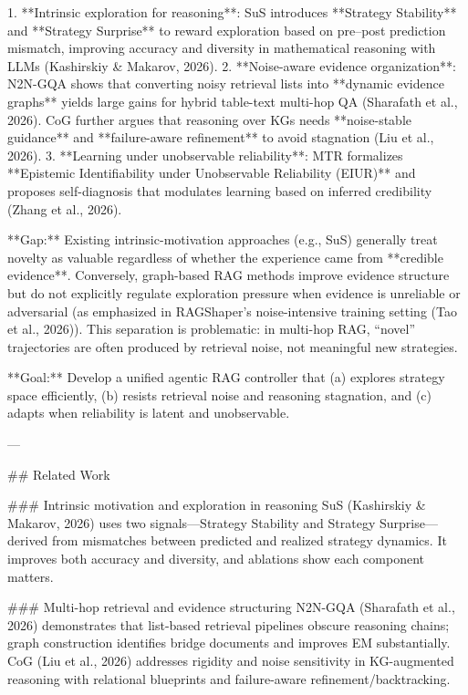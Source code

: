 1. **Intrinsic exploration for reasoning**: SuS introduces **Strategy Stability** and **Strategy Surprise** to reward exploration based on pre–post prediction mismatch, improving accuracy and diversity in mathematical reasoning with LLMs (Kashirskiy & Makarov, 2026).  
2. **Noise-aware evidence organization**: N2N-GQA shows that converting noisy retrieval lists into **dynamic evidence graphs** yields large gains for hybrid table-text multi-hop QA (Sharafath et al., 2026). CoG further argues that reasoning over KGs needs **noise-stable guidance** and **failure-aware refinement** to avoid stagnation (Liu et al., 2026).  
3. **Learning under unobservable reliability**: MTR formalizes **Epistemic Identifiability under Unobservable Reliability (EIUR)** and proposes self-diagnosis that modulates learning based on inferred credibility (Zhang et al., 2026).

**Gap:** Existing intrinsic-motivation approaches (e.g., SuS) generally treat novelty as valuable regardless of whether the experience came from **credible evidence**. Conversely, graph-based RAG methods improve evidence structure but do not explicitly regulate exploration pressure when evidence is unreliable or adversarial (as emphasized in RAGShaper’s noise-intensive training setting (Tao et al., 2026)). This separation is problematic: in multi-hop RAG, “novel” trajectories are often produced by retrieval noise, not meaningful new strategies.

**Goal:** Develop a unified agentic RAG controller that (a) explores strategy space efficiently, (b) resists retrieval noise and reasoning stagnation, and (c) adapts when reliability is latent and unobservable.

---

## Related Work  

### Intrinsic motivation and exploration in reasoning  
SuS (Kashirskiy & Makarov, 2026) uses two signals—Strategy Stability and Strategy Surprise—derived from mismatches between predicted and realized strategy dynamics. It improves both accuracy and diversity, and ablations show each component matters.

### Multi-hop retrieval and evidence structuring  
N2N-GQA (Sharafath et al., 2026) demonstrates that list-based retrieval pipelines obscure reasoning chains; graph construction identifies bridge documents and improves EM substantially. CoG (Liu et al., 2026) addresses rigidity and noise sensitivity in KG-augmented reasoning with relational blueprints and failure-aware refinement/backtracking.

